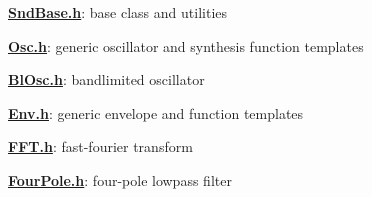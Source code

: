 {\bfseries \hyperlink{_snd_base_8h}{Snd\+Base.\+h}}\+: base class and utilities

{\bfseries \hyperlink{_osc_8h}{Osc.\+h}}\+: generic oscillator and synthesis function templates

{\bfseries \hyperlink{_bl_osc_8h}{Bl\+Osc.\+h}}\+: bandlimited oscillator

{\bfseries \hyperlink{_env_8h}{Env.\+h}}\+: generic envelope and function templates

{\bfseries \hyperlink{_f_f_t_8h}{F\+F\+T.\+h}}\+: fast-\/fourier transform

{\bfseries \hyperlink{_four_pole_8h}{Four\+Pole.\+h}}\+: four-\/pole lowpass filter 